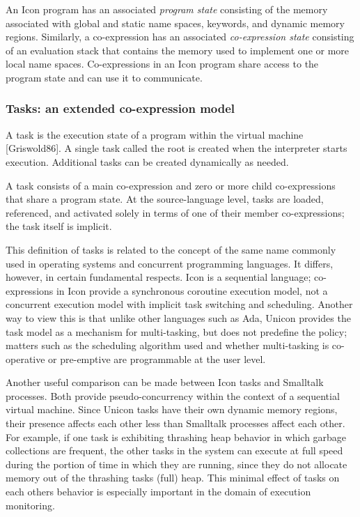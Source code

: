 An Icon program has an associated \textit{program state} consisting of
the memory associated with global and static name spaces, keywords, and
dynamic memory regions. Similarly, a co-expression has an associated
\textit{co-expression state} consisting of an evaluation stack that
contains the memory used to implement one or more local name spaces.
Co-expressions in an Icon program share access to the program state and
can use it to communicate. 

\subsubsection{Tasks: an extended co-expression model}

A task is the execution state of a program within the virtual machine
[Griswold86]. A single task called the root is created when the
interpreter starts execution. Additional tasks can be created
dynamically as needed.

A task consists of a main co-expression and zero or more child
co-expressions that share a program state. At the source-language
level, tasks are loaded, referenced, and activated solely in terms of
one of their member co-expressions; the task itself is
implicit.

This definition of tasks is related to the concept of the same name
commonly used in operating systems and concurrent programming
languages. It differs, however, in certain fundamental respects. Icon
is a sequential language; co-expressions in Icon provide a synchronous
coroutine execution model, not a concurrent execution model with
implicit task switching and scheduling. Another way to view this is
that unlike other languages such as Ada, Unicon provides the task model
as a mechanism for multi-tasking, but does not predefine the policy;
matters such as the scheduling algorithm used and whether multi-tasking
is co-operative or pre-emptive are programmable at the user
level.

Another useful comparison can be made between Icon tasks and Smalltalk
processes. Both provide pseudo-concurrency within the context of a
sequential virtual machine. Since Unicon tasks have their own dynamic
memory regions, their presence affects each other less than Smalltalk
processes affect each other. For example, if one task is exhibiting
thrashing heap behavior in which garbage collections are frequent, the
other tasks in the system can execute at full speed during the portion
of time in which they are running, since they do not allocate memory
out of the thrashing task{\textquotesingle}s (full) heap. This minimal
effect of tasks on each others{\textquotesingle} behavior is especially
important in the domain of execution monitoring. 

